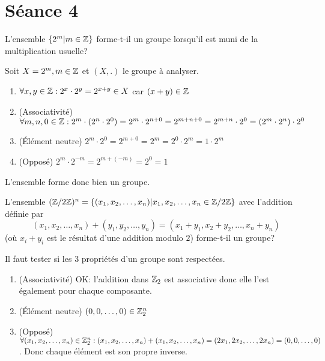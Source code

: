 
\section{Séance 4}

\begin{exo}
L'ensemble $\{2^m | m \in \mathbb{Z}\}$ forme-t-il un groupe lorsqu'il est muni de la multiplication usuelle?
\end{exo}

Soit $X=2^{m}, m \in \mathbb{Z}$ et $(X,.)$ le groupe à analyser.

\begin{enumerate}
\item $\forall x,y \in \mathbb{Z} : 2^{x} \cdot 2^{y} = 2^{x+y} \in X$ car $(x+y) \in \mathbb{Z}$
\item (Associativité) $\forall m,n,0 \in \mathbb{Z}: 2^m \cdot (2^n \cdot 2^0) = 2^m \cdot 2^{n+0} = 2^{m+n+0} = 2^{m+n} \cdot 2^0 = (2^m \cdot 2^n) \cdot 2^0$
\item (Élément neutre) $2^m \cdot 2^0 = 2^{m+0} = 2^m = 2^0 \cdot 2^m = 1 \cdot 2^m$
\item (Opposé) $2^m \cdot 2^{-m} = 2^{m+(-m)} = 2^0 = 1$  
\end{enumerate}

L'ensemble forme donc bien un groupe.


\vspace*{0.8cm}
\begin{exo}
L'ensemble $(\mathbb{Z}/2\mathbb{Z})^n=\{(x_1,x_2,\ldots,x_n)|x_1,x_2,\ldots,x_n\in \mathbb{Z}/2\mathbb{Z}\}$ avec l'addition d\'efinie par $$(x_1,x_2,\ldots,x_n)+(y_1,y_2,\ldots,y_n)=(x_1+y_1,x_2+y_2,\ldots,x_n+y_n)$$
(o\`u $x_i+y_i$ est le r\'esultat d'une addition modulo $2$) forme-t-il un groupe?
\end{exo}

Il faut tester si les 3 propriétés d'un groupe sont respectées.

\begin{enumerate}
\item (Associativité) OK: l'addition dans $\mathbb{Z}_2$ est associative donc elle l'est également pour chaque composante.
\item (Élément neutre) $(0,0,\ldots,0) \in \mathbb{Z}^{n}_{2}$ 
\item (Opposé) $\forall (x_1, x_2, \ldots, x_n) \in \mathbb{Z}^{n}_{2}: (x_1, x_2, \ldots, x_n) + (x_1, x_2, \ldots, x_n) = (2x_1, 2x_2, \ldots, 2x_n) = (0,0,\ldots,0)$. Donc chaque élément est son propre inverse.
\end{enumerate}

